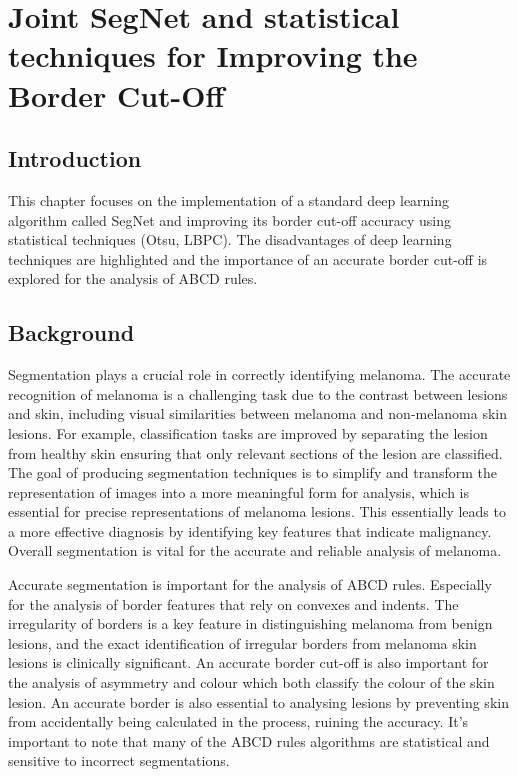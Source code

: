 \chapter{Joint SegNet and statistical techniques for Improving the Border Cut-Off}

\section{Introduction}
This chapter focuses on the implementation of a standard deep learning algorithm called SegNet and improving its border cut-off accuracy using statistical techniques (Otsu, LBPC). The disadvantages of deep learning techniques are highlighted and the importance of an accurate border cut-off is explored for the analysis of ABCD rules.

\section{Background}
Segmentation plays a crucial role in correctly identifying melanoma. The accurate recognition of melanoma is a challenging task due to the contrast between lesions and skin, including visual similarities between melanoma and non-melanoma skin lesions\cite{Li2018a}. For example, classification tasks are improved by separating the lesion from healthy skin ensuring that only relevant sections of the lesion are classified\cite{Albahli2020, bi2019}. The goal of producing segmentation techniques is to simplify and transform the representation of images into a more meaningful form for analysis, which is essential for precise representations of melanoma lesions\cite{Masood2013a}. This essentially leads to a more effective diagnosis by identifying key features that indicate malignancy\cite{Ali2020a}. Overall segmentation is vital for the accurate and reliable analysis of melanoma.

Accurate segmentation is important for the analysis of ABCD rules\cite{Lee2020}. Especially for the analysis of border features\cite{Pereira2020, Kaya2016} that rely on convexes and indents. The irregularity of borders is a key feature in distinguishing melanoma from benign lesions, and the exact identification of irregular borders from melanoma skin lesions is clinically significant\cite{patil2021}. An accurate border cut-off is also important for the analysis of asymmetry and colour which both classify the colour of the skin lesion. An accurate border is also essential to analysing lesions by preventing skin from accidentally being calculated in the process, ruining the accuracy. It's important to note that many of the ABCD rules algorithms are statistical and sensitive to incorrect segmentations.

